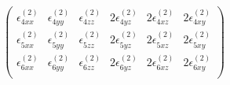 \begin{equation*}
\begin{pmatrix}
\epsilon_{4xx}^{\left(2\right)}&\epsilon_{4yy}^{\left(2\right)}&\epsilon_{4zz}^{\left(2\right)}&2\epsilon_{4yz}^{\left(2\right)}&2\epsilon_{4xz}^{\left(2\right)}&2\epsilon_{4xy}^{\left(2\right)} \\
\epsilon_{5xx}^{\left(2\right)}&\epsilon_{5yy}^{\left(2\right)}&\epsilon_{5zz}^{\left(2\right)}&2\epsilon_{5yz}^{\left(2\right)}&2\epsilon_{5xz}^{\left(2\right)}&2\epsilon_{5xy}^{\left(2\right)} \\
\epsilon_{6xx}^{\left(2\right)}&\epsilon_{6yy}^{\left(2\right)}&\epsilon_{6zz}^{\left(2\right)}&2\epsilon_{6yz}^{\left(2\right)}&2\epsilon_{6xz}^{\left(2\right)}&2\epsilon_{6xy}^{\left(2\right)} \\
\end{pmatrix} 
\end{equation*}
\\
